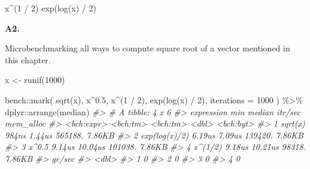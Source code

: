 \documentclass[
]{book}
\newenvironment{Shaded}{\begin{snugshade}}{\end{snugshade}}
\newcommand{\AttributeTok}[1]{\textcolor[rgb]{0.77,0.63,0.00}{#1}}
\newcommand{\CommentTok}[1]{\textcolor[rgb]{0.56,0.35,0.01}{\textit{#1}}}
\newcommand{\DecValTok}[1]{\textcolor[rgb]{0.00,0.00,0.81}{#1}}
\newcommand{\FloatTok}[1]{\textcolor[rgb]{0.00,0.00,0.81}{#1}}
\newcommand{\FunctionTok}[1]{\textcolor[rgb]{0.00,0.00,0.00}{#1}}
\newcommand{\NormalTok}[1]{#1}
\newcommand{\OtherTok}[1]{\textcolor[rgb]{0.56,0.35,0.01}{#1}}
\newcommand{\SpecialCharTok}[1]{\textcolor[rgb]{0.00,0.00,0.00}{#1}}
\begin{document}
\begin{Shaded}
\begin{Highlighting}[]
\NormalTok{x}\SpecialCharTok{\^{}}\NormalTok{(}\DecValTok{1} \SpecialCharTok{/} \DecValTok{2}\NormalTok{)}
\FunctionTok{exp}\NormalTok{(}\FunctionTok{log}\NormalTok{(x) }\SpecialCharTok{/} \DecValTok{2}\NormalTok{)}
\end{Highlighting}
\end{Shaded}

\textbf{A2.}

Microbenchmarking all ways to compute square root of a vector mentioned in this chapter.

\begin{Shaded}
\begin{Highlighting}[]
\NormalTok{x }\OtherTok{\textless{}{-}} \FunctionTok{runif}\NormalTok{(}\DecValTok{1000}\NormalTok{)}

\NormalTok{bench}\SpecialCharTok{::}\FunctionTok{mark}\NormalTok{(}
  \FunctionTok{sqrt}\NormalTok{(x),}
\NormalTok{  x}\SpecialCharTok{\^{}}\FloatTok{0.5}\NormalTok{,}
\NormalTok{  x}\SpecialCharTok{\^{}}\NormalTok{(}\DecValTok{1} \SpecialCharTok{/} \DecValTok{2}\NormalTok{),}
  \FunctionTok{exp}\NormalTok{(}\FunctionTok{log}\NormalTok{(x) }\SpecialCharTok{/} \DecValTok{2}\NormalTok{),}
  \AttributeTok{iterations =} \DecValTok{1000}
\NormalTok{) }\SpecialCharTok{\%\textgreater{}\%}
\NormalTok{  dplyr}\SpecialCharTok{::}\FunctionTok{arrange}\NormalTok{(median)}
\CommentTok{\#\textgreater{} \# A tibble: 4 x 6}
\CommentTok{\#\textgreater{}   expression         min   median \textasciigrave{}itr/sec\textasciigrave{} mem\_alloc}
\CommentTok{\#\textgreater{}   \textless{}bch:expr\textgreater{}    \textless{}bch:tm\textgreater{} \textless{}bch:tm\textgreater{}     \textless{}dbl\textgreater{} \textless{}bch:byt\textgreater{}}
\CommentTok{\#\textgreater{} 1 sqrt(x)          984ns   1.44us   565188.    7.86KB}
\CommentTok{\#\textgreater{} 2 exp(log(x)/2)   6.19us   7.09us   139420.    7.86KB}
\CommentTok{\#\textgreater{} 3 x\^{}0.5           9.14us  10.04us   101038.    7.86KB}
\CommentTok{\#\textgreater{} 4 x\^{}(1/2)         9.18us  10.21us    98318.    7.86KB}
\CommentTok{\#\textgreater{}   \textasciigrave{}gc/sec\textasciigrave{}}
\CommentTok{\#\textgreater{}      \textless{}dbl\textgreater{}}
\CommentTok{\#\textgreater{} 1        0}
\CommentTok{\#\textgreater{} 2        0}
\CommentTok{\#\textgreater{} 3        0}
\CommentTok{\#\textgreater{} 4        0}
\end{Highlighting}
\end{Shaded}
\end{document}
